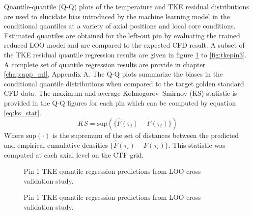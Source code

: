 Quantile-quantile (Q-Q) plots of the  temperature and TKE residual distributions are used to elucidate bias introduced by the machine learning model in the conditional quantiles at a variety of axial positions and local core conditions.  Estimated quantiles are obtained for the left-out pin by evaluating the trained reduced LOO model and are compared to the expected CFD result.
A subset of the TKE residual quantile regression results are given in figure \ref{fig:tkepin1} to \ref{fig:tkepin3}.  A complete set of quantile regression results are provide in chapter \ref{chap:app_ml}, Appendix A. The Q-Q plots summarize the biases in the conditional quantile distributions when compared to the target golden standard CFD data.  The maximum and average Kolmogorov–Smirnov (KS) statistic is provided in the Q-Q figures for each pin which can be computed by equation \ref{eq:ks_stat}.
\begin{equation}
KS = \mathrm{sup}(\{\hat F(\tau_i) - F(\tau_i)\})
\label{eq:ks_stat}
\end{equation}
Where $\mathrm{sup}(\cdot)$ is the supremum of the set of distances between the predicted and empirical cumulative densities $\{\hat F(\tau_i) - F(\tau_i)\}$.
This statistic was computed at each axial level on the CTF grid.

\begin{figure}[H]%
    \centering
    \qquad
    \caption[Q-Q LOO TKE pin 1 results.]{Pin 1 TKE quantile regression predictions from LOO cross validation study.}%
    \label{fig:tkepin1}%
\end{figure}

\begin{figure}[H]%
    \centering
    \qquad
    \caption[Q-Q LOO TKE pin 2 results.]{Pin 1 TKE quantile regression predictions from LOO cross validation study.}%
    \label{fig:tkepin2}%
\end{figure}

